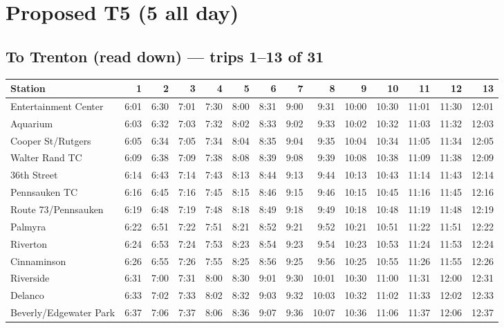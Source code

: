 \section{Proposed T5 (5 all day)}\label{tt:proposed_T5}
\subsection*{To Trenton (read down) --- trips 1--13 of 31}
\begin{center}\footnotesize\setlength{\tabcolsep}{3pt}\begin{tabular}{@{}lrrrrrrrrrrrrr@{}}\toprule
Station & 1 & 2 & 3 & 4 & 5 & 6 & 7 & 8 & 9 & 10 & 11 & 12 & 13 \\\midrule
Entertainment Center & 6:01 & 6:30 & 7:01 & 7:30 & 8:00 & 8:31 & 9:00 & 9:31 & 10:00 & 10:30 & 11:01 & 11:30 & 12:01 \\
Aquarium & 6:03 & 6:32 & 7:03 & 7:32 & 8:02 & 8:33 & 9:02 & 9:33 & 10:02 & 10:32 & 11:03 & 11:32 & 12:03 \\
Cooper St/Rutgers & 6:05 & 6:34 & 7:05 & 7:34 & 8:04 & 8:35 & 9:04 & 9:35 & 10:04 & 10:34 & 11:05 & 11:34 & 12:05 \\
Walter Rand TC & 6:09 & 6:38 & 7:09 & 7:38 & 8:08 & 8:39 & 9:08 & 9:39 & 10:08 & 10:38 & 11:09 & 11:38 & 12:09 \\
36th Street & 6:14 & 6:43 & 7:14 & 7:43 & 8:13 & 8:44 & 9:13 & 9:44 & 10:13 & 10:43 & 11:14 & 11:43 & 12:14 \\
Pennsauken TC & 6:16 & 6:45 & 7:16 & 7:45 & 8:15 & 8:46 & 9:15 & 9:46 & 10:15 & 10:45 & 11:16 & 11:45 & 12:16 \\
Route 73/Pennsauken & 6:19 & 6:48 & 7:19 & 7:48 & 8:18 & 8:49 & 9:18 & 9:49 & 10:18 & 10:48 & 11:19 & 11:48 & 12:19 \\
Palmyra & 6:22 & 6:51 & 7:22 & 7:51 & 8:21 & 8:52 & 9:21 & 9:52 & 10:21 & 10:51 & 11:22 & 11:51 & 12:22 \\
Riverton & 6:24 & 6:53 & 7:24 & 7:53 & 8:23 & 8:54 & 9:23 & 9:54 & 10:23 & 10:53 & 11:24 & 11:53 & 12:24 \\
Cinnaminson & 6:26 & 6:55 & 7:26 & 7:55 & 8:25 & 8:56 & 9:25 & 9:56 & 10:25 & 10:55 & 11:26 & 11:55 & 12:26 \\
Riverside & 6:31 & 7:00 & 7:31 & 8:00 & 8:30 & 9:01 & 9:30 & 10:01 & 10:30 & 11:00 & 11:31 & 12:00 & 12:31 \\
Delanco & 6:33 & 7:02 & 7:33 & 8:02 & 8:32 & 9:03 & 9:32 & 10:03 & 10:32 & 11:02 & 11:33 & 12:02 & 12:33 \\
Beverly/Edgewater Park & 6:37 & 7:06 & 7:37 & 8:06 & 8:36 & 9:07 & 9:36 & 10:07 & 10:36 & 11:06 & 11:37 & 12:06 & 12:37 \\

\end{tabular}
\end{center}
